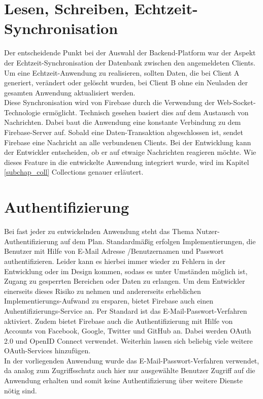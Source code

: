 \section{Lesen, Schreiben, Echtzeit-Synchronisation}
Der entscheidende Punkt bei der Auswahl der Backend-Platform war der Aspekt der Echtzeit-Synchronisation der Datenbank zwischen den angemeldeten Clients.
Um eine Echtzeit-Anwendung zu realisieren, sollten Daten, die bei Client A generiert, verändert oder gelöscht wurden, bei Client B ohne ein Neuladen der gesamten Anwendung aktualisiert werden.\\
Diese Synchronisation wird von Firebase durch die Verwendung der Web-Socket-Technologie ermöglicht. Technisch gesehen basiert dies auf dem Austausch von Nachrichten. Dabei baut die Anwendung eine konstante Verbindung
zu dem Firebase-Server auf. Sobald eine Daten-Transaktion abgeschlossen ist, sendet Firebase eine Nachricht an alle verbundenen Clients. Bei der Entwicklung kann der Entwickler entscheiden, ob er auf etwaige Nachrichten reagieren möchte.
Wie dieses Feature in die entwickelte Anwendung integriert wurde, wird im Kapitel \ref{subchap_coll} Collections genauer erläutert.

\section{Authentifizierung}
\label{chap_auth}
Bei fast jeder zu entwickelnden Anwendung steht das Thema Nutzer- Authentifizierung auf dem Plan. Standardmäßig erfolgen Implementierungen, die Benutzer mit Hilfe von E-Mail Adresse /Benutzernamen und Passwort authentifizieren.
Leider kann es hierbei immer wieder zu Fehlern in der Entwicklung oder im Design kommen, sodass es unter Umständen möglich ist, Zugang zu gesperrten Bereichen oder Daten zu erlangen.
Um dem Entwickler einerseits dieses Risiko zu nehmen und andererseits erheblichen Implementierungs-Aufwand zu ersparen, bietet Firebase auch einen Auhentifizierungs-Service an.
Per Standard ist das E-Mail-Passwort-Verfahren aktiviert. Zudem bietet Firebase auch die Authentifizierung mit Hilfe von Accounts von Facebook, Google, Twitter und GitHub an. Dabei werden OAuth 2.0 und OpenID Connect verwendet. Weiterhin lassen sich
beliebig viele weitere OAuth-Services hinzufügen.\\

In der vorliegenden Anwendung wurde das E-Mail-Passwort-Verfahren verwendet, da analog zum Zugriffsschutz auch hier nur ausgewählte Benutzer Zugriff auf die Anwendung erhalten und somit keine Authentifizierung über weitere Dienste nötig sind.

